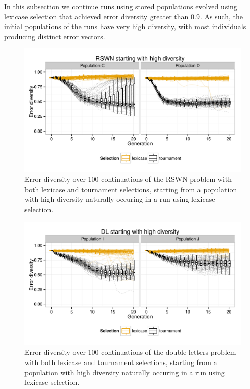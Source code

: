 \documentclass{sig-alternate-05-2015}
\begin{document}
In this subsection we continue runs using stored populations evolved using lexicase selection that achieved error diversity greater than 0.9. As such, the initial populations of the runs have very high diversity, with most individuals producing distinct error vectors.

\begin{figure}
	\includegraphics{../figures/RSWN_high_diversity}
	\vspace{-1 cm}
	\caption{Error diversity over 100 continuations of the RSWN problem with both lexicase and tournament selections, starting from a population with high diversity naturally occuring in a run using lexicase selection.}
	\label{fig:RSWNhighDiversity}
\end{figure}

\begin{figure}
	\includegraphics{../figures/DL_high_diversity}
	\vspace{-1 cm}
	\caption{Error diversity over 100 continuations of the double-letters problem with both lexicase and tournament selections, starting from a population with high diversity naturally occuring in a run using lexicase selection.}
	\label{fig:DLhighDiversity}
\end{figure}
\end{document}
